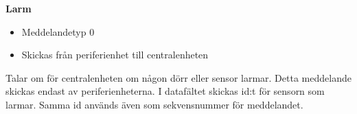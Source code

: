 \textbf{Larm}
\begin{itemize}
	\item Meddelandetyp 0
	\item Skickas från periferienhet till centralenheten
\end{itemize}	
Talar om för centralenheten om någon dörr eller sensor larmar. Detta meddelande skickas endast av periferienheterna. I datafältet skickas id:t för sensorn som larmar. Samma id används även som sekvensnummer för meddelandet.\\
